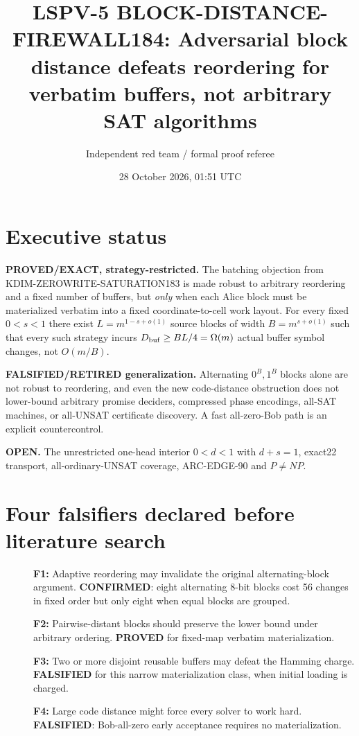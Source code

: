 \documentclass[11pt]{article}
\title{LSPV-5 BLOCK-DISTANCE-FIREWALL184: Adversarial block distance defeats reordering for verbatim buffers, not arbitrary SAT algorithms}
\author{Independent red team / formal proof referee}
\date{28 October 2026, 01:51 UTC}
\begin{document}
\maketitle

\section*{Executive status}
\noindent\textbf{PROVED/EXACT, strategy-restricted.} The batching objection from KDIM-ZEROWRITE-SATURATION183 is made robust to arbitrary reordering and a fixed number of buffers, but \emph{only} when each Alice block must be materialized verbatim into a fixed coordinate-to-cell work layout. For every fixed \(0<s<1\) there exist \(L=m^{1-s+o(1)}\) source blocks of width \(B=m^{s+o(1)}\) such that every such strategy incurs \(D_{\rm buf}\ge BL/4=\Omega(m)\) actual buffer symbol changes, not \(O(m/B)\).
\par\noindent\textbf{FALSIFIED/RETIRED generalization.} Alternating \(0^B,1^B\) blocks alone are not robust to reordering, and even the new code-distance obstruction does not lower-bound arbitrary promise deciders, compressed phase encodings, all-SAT machines, or all-UNSAT certificate discovery. A fast all-zero-Bob path is an explicit countercontrol.
\par\noindent\textbf{OPEN.} The unrestricted one-head interior \(0<d<1\) with \(d+s=1\), exact22 transport, all-ordinary-UNSAT coverage, ARC-EDGE-90 and \(P\ne NP\).

\section{Four falsifiers declared before literature search}
\begin{description}
\item[]\textbf{F1:} Adaptive reordering may invalidate the original alternating-block argument. \textbf{CONFIRMED}: eight alternating 8-bit blocks cost 56 changes in fixed order but only eight when equal blocks are grouped.
\item[]\textbf{F2:} Pairwise-distant blocks should preserve the lower bound under arbitrary ordering. \textbf{PROVED} for fixed-map verbatim materialization.
\item[]\textbf{F3:} Two or more disjoint reusable buffers may defeat the Hamming charge. \textbf{FALSIFIED} for this narrow materialization class, when initial loading is charged.
\item[]\textbf{F4:} Large code distance might force every solver to work hard. \textbf{FALSIFIED}: Bob-all-zero early acceptance requires no materialization.
\end{description}
\end{document}

